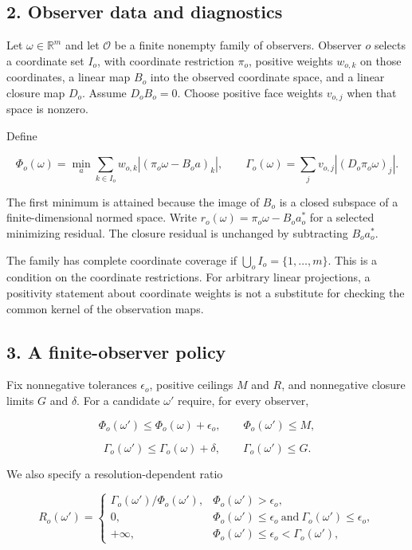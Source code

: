 \documentclass[
]{article}
\begin{document}
\subsection{2. Observer data and
diagnostics}\label{observer-data-and-diagnostics}

Let \(\omega\in\mathbb R^m\) and let \(\mathcal O\) be a finite nonempty
family of observers. Observer \(o\) selects a coordinate set \(I_o\),
with coordinate restriction \(\pi_o\), positive weights \(w_{o,k}\) on
those coordinates, a linear map \(B_o\) into the observed coordinate
space, and a linear closure map \(D_o\). Assume \(D_oB_o=0\). Choose
positive face weights \(v_{o,j}\) when that space is nonzero.

Define

\[
\Phi_o(\omega)=\min_a\sum_{k\in I_o}w_{o,k}
 |(\pi_o\omega-B_oa)_k|,
\qquad
\Gamma_o(\omega)=\sum_jv_{o,j}|(D_o\pi_o\omega)_j|.
\]

The first minimum is attained because the image of \(B_o\) is a closed
subspace of a finite-dimensional normed space. Write
\(r_o(\omega)=\pi_o\omega-B_oa_o^*\) for a selected minimizing residual.
The closure residual is unchanged by subtracting \(B_oa_o^*\).

The family has complete coordinate coverage if
\(\bigcup_o I_o=\{1,\ldots,m\}\). This is a condition on the coordinate
restrictions. For arbitrary linear projections, a positivity statement
about coordinate weights is not a substitute for checking the common
kernel of the observation maps.

\subsection{3. A finite-observer policy}\label{a-finite-observer-policy}

Fix nonnegative tolerances \(\epsilon_o\), positive ceilings \(M\) and
\(R\), and nonnegative closure limits \(G\) and \(\delta\). For a
candidate \(\omega'\) require, for every observer,

\[
\Phi_o(\omega')\le\Phi_o(\omega)+\epsilon_o,\qquad
\Phi_o(\omega')\le M,
\]

\[
\Gamma_o(\omega')\le\Gamma_o(\omega)+\delta,\qquad
\Gamma_o(\omega')\le G.
\]

We also specify a resolution-dependent ratio

\[
R_o(\omega')=
\begin{cases}
\Gamma_o(\omega')/\Phi_o(\omega'),&\Phi_o(\omega')>\epsilon_o,\\
0,&\Phi_o(\omega')\le\epsilon_o\ \text{and}\ \Gamma_o(\omega')\le\epsilon_o,\\
+\infty,&\Phi_o(\omega')\le\epsilon_o<\Gamma_o(\omega'),
\end{cases}
\]
\end{document}
